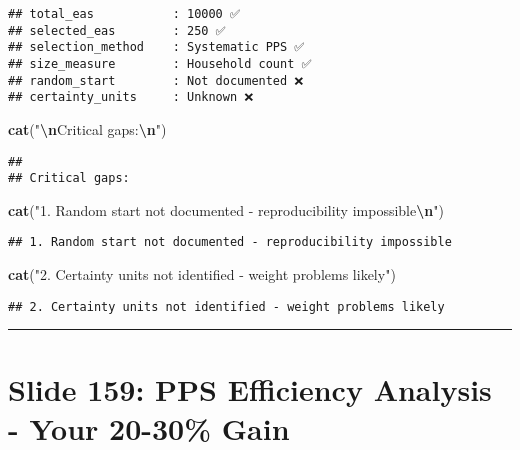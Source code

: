 \documentclass[
]{article}
\newenvironment{Shaded}{\begin{snugshade}}{\end{snugshade}}
\newcommand{\FunctionTok}[1]{\textcolor[rgb]{0.13,0.29,0.53}{\textbf{#1}}}
\newcommand{\NormalTok}[1]{#1}
\newcommand{\SpecialCharTok}[1]{\textcolor[rgb]{0.81,0.36,0.00}{\textbf{#1}}}
\newcommand{\StringTok}[1]{\textcolor[rgb]{0.31,0.60,0.02}{#1}}
\begin{document}
\begin{verbatim}
## total_eas           : 10000 ✅
## selected_eas        : 250 ✅
## selection_method    : Systematic PPS ✅
## size_measure        : Household count ✅
## random_start        : Not documented ❌
## certainty_units     : Unknown ❌
\end{verbatim}

\begin{Shaded}
\begin{Highlighting}[]
\FunctionTok{cat}\NormalTok{(}\StringTok{"}\SpecialCharTok{\textbackslash{}n}\StringTok{Critical gaps:}\SpecialCharTok{\textbackslash{}n}\StringTok{"}\NormalTok{)}
\end{Highlighting}
\end{Shaded}

\begin{verbatim}
## 
## Critical gaps:
\end{verbatim}

\begin{Shaded}
\begin{Highlighting}[]
\FunctionTok{cat}\NormalTok{(}\StringTok{"1. Random start not documented {-} reproducibility impossible}\SpecialCharTok{\textbackslash{}n}\StringTok{"}\NormalTok{)}
\end{Highlighting}
\end{Shaded}

\begin{verbatim}
## 1. Random start not documented - reproducibility impossible
\end{verbatim}

\begin{Shaded}
\begin{Highlighting}[]
\FunctionTok{cat}\NormalTok{(}\StringTok{"2. Certainty units not identified {-} weight problems likely"}\NormalTok{)}
\end{Highlighting}
\end{Shaded}

\begin{verbatim}
## 2. Certainty units not identified - weight problems likely
\end{verbatim}

\begin{center}\rule{0.5\linewidth}{0.5pt}\end{center}

\section{Slide 159: PPS Efficiency Analysis - Your 20-30\%
Gain}\label{slide-159-pps-efficiency-analysis---your-20-30-gain}
\end{document}

